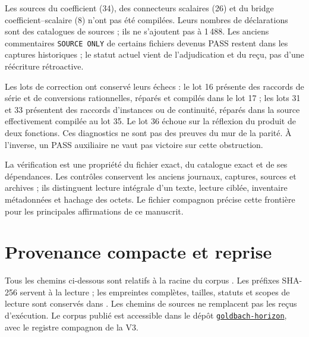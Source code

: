 \documentclass[11pt,a4paper]{article}
\theoremstyle{remark}
\begin{document}
Les sources du coefficient (34), des connecteurs scalaires (26) et du
bridge coefficient--scalaire (8) n'ont pas été compilées. Leurs nombres
de déclarations sont des catalogues de sources ; ils ne s'ajoutent pas
à 1\,488. Les anciens commentaires \texttt{SOURCE ONLY} de certains
fichiers devenus PASS restent dans les captures historiques ; le statut
actuel vient de l'adjudication et du reçu, pas d'une réécriture rétroactive.

Les lots de correction ont conservé leurs échecs : le lot 16 présente
des raccords de série et de conversions rationnelles, réparés et compilés
dans le lot 17 ; les lots 31 et 33 présentent des raccords d'instances
ou de continuité, réparés dans la source effectivement compilée au lot
35. Le lot 36 échoue sur la réflexion du produit de deux fonctions.
Ces diagnostics ne sont pas des preuves du mur de la parité. À
l'inverse, un PASS auxiliaire ne vaut pas victoire sur cette obstruction.

La vérification est une propriété du fichier exact, du catalogue exact
et de ses dépendances. Les contrôles conservent les anciens journaux,
captures, sources et archives ; ils distinguent lecture intégrale d'un
texte, lecture ciblée, inventaire métadonnées et hachage des octets.
Le fichier compagnon  précise cette frontière
pour les principales affirmations de ce manuscrit.

\clearpage
\appendix
\section{Provenance compacte et reprise}\label{app:provenance}
Tous les chemins ci-dessous sont relatifs à la racine du corpus
. Les préfixes SHA-256 servent à la lecture ;
les empreintes complètes, tailles, statuts et scopes de lecture sont
conservés dans . Les chemins de sources
ne remplacent pas les reçus d'exécution.
Le corpus publié est accessible dans le dépôt
\href{https://github.com/seisner1967-hash/goldbach-horizon}{\texttt{goldbach-horizon}},
avec le registre compagnon de la V3.
\end{document}

